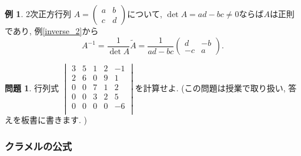 \documentclass[dvipdfmx,a4paper,11pt]{article}
\theoremstyle{definition}
\newtheorem{exa}[thm]{例}
\newtheorem{ques}[thm]{問題}
\begin{document}
\begin{exa}
2次正方行列
$
A = 
\begin{pmatrix}
a & b \\
c & d
\end{pmatrix}
$について, $\det A =ad-bc \neq0$ならば$A$は正則であり, 
例\ref{inverse_2}から
$$
A^{-1} = \frac{1}{\det A} \tilde{A}
=\frac{1}{ad-bc}
\begin{pmatrix}
d & -b \\
-c & a
\end{pmatrix}.
$$
\end{exa}

\begin{ques}
行列式
$
\begin{vmatrix}
3 & 5&1 & 2&-1\\
2 & 6&0 & 9&1\\
0 & 0& 7& 1&2\\
0 & 0& 3& 2&5\\
0 & 0& 0& 0&-6\\
\end{vmatrix}
$を計算せよ.
(この問題は授業で取り扱い, 答えを板書に書きます. )

\end{ques}

\subsubsection{クラメルの公式}
\end{document}
